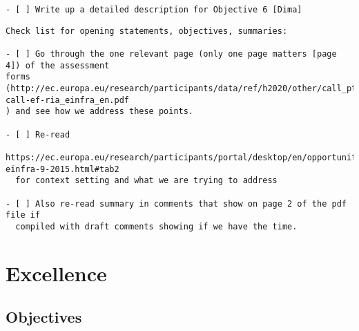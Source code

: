 \documentclass[noworkareas,deliverables,\classoptions]{euproposal}       %
\begin{document}
\begin{proposal}
\begin{draft}
\begin{verbatim}
- [ ] Write up a detailed description for Objective 6 [Dima]
\end{verbatim}

\end{draft}
\begin{draft}

\begin{verbatim}
Check list for opening statements, objectives, summaries:

- [ ] Go through the one relevant page (only one page matters [page 4]) of the assessment
forms
(http://ec.europa.eu/research/participants/data/ref/h2020/other/call_ptef/ef/h2020-call-ef-ria_einfra_en.pdf
) and see how we address these points. 

- [ ] Re-read
  https://ec.europa.eu/research/participants/portal/desktop/en/opportunities/h2020/topics/2144-einfra-9-2015.html#tab2
  for context setting and what we are trying to address

- [ ] Also re-read summary in comments that show on page 2 of the pdf file if
  compiled with draft comments showing if we have the time.
\end{verbatim}
\clearpage
\end{draft}




\section{Excellence}



\subsection{Objectives}
\label{sect:objectives}



\end{proposal}
\end{document}
